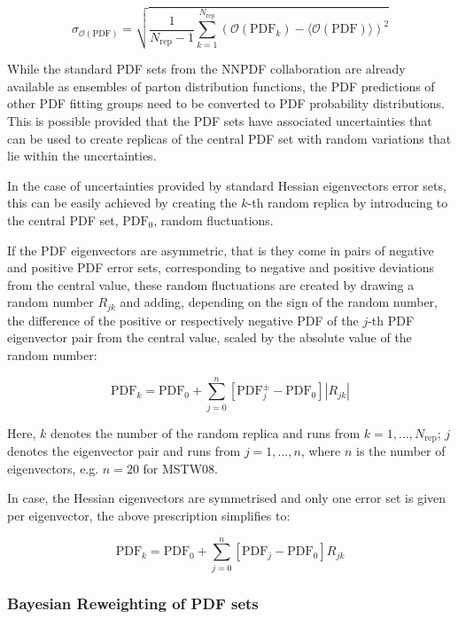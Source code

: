 \begin{equation}
\sigma_{\mathcal{O}(\mathrm{PDF})} = \sqrt{  \frac{1}{N_{\mathrm{rep}} - 1 }  \sum_{k=1}^{N_{\mathrm{rep}}} 
( \mathcal{O}(\mathrm{PDF}_k) - \langle \mathcal{O}(\mathrm{PDF})  \rangle   )^2     
     }
\end{equation}

While the standard PDF sets from the NNPDF collaboration are already available as ensembles of parton distribution functions, the PDF predictions of other PDF fitting groups need to be converted to PDF probability distributions. This is possible provided that the PDF sets have associated uncertainties that can be used to create replicas of the central PDF set with random variations that lie within the uncertainties. 

In the case of uncertainties provided by standard Hessian eigenvectors error sets, this can be easily achieved by creating the $k$-th random replica by introducing to the central PDF set, $\mathrm{PDF}_0$, random fluctuations. 

If the PDF eigenvectors are asymmetric, that is they come in pairs of negative and positive PDF error sets, corresponding to negative and positive deviations from the central value, these random fluctuations are created by drawing a random number $R_{jk}$ and adding, depending on the sign of the random number, the difference of the positive or respectively negative PDF of the $j$-th PDF eigenvector pair from the central value, scaled by the absolute value of the random number:

\begin{equation}
 \mathrm{PDF}_k = \mathrm{PDF}_0  + \sum_{j=0}^{n} \left[ \mathrm{PDF}^{\pm}_j - \mathrm{PDF}_0 \right] |R_{jk}|
\end{equation}
 
Here, $k$ denotes the number of the random replica and runs from $k=1, ... , N_\mathrm{rep}$; $j$ denotes the eigenvector pair and runs from $j=1, ..., n$, where $n$ is the number of eigenvectors, e.g. $n=20$ for MSTW08. 

In case, the Hessian eigenvectors are symmetrised and only one error set is given per eigenvector, the above prescription simplifies to:
   
\begin{equation}
 \mathrm{PDF}_k = \mathrm{PDF}_0  + \sum_{j=0}^{n} \left[ \mathrm{PDF}_j - \mathrm{PDF}_0 \right] R_{jk}
\end{equation}

\subsubsection{Bayesian Reweighting of PDF sets}

